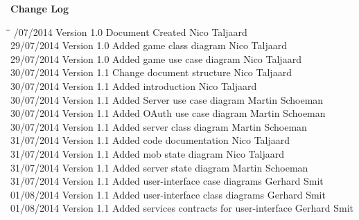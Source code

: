 \documentclass[letterpaper]{article}
\begin{document}
\begin{titlepage}
\begin{center}
\end{center}
\vfill %

\end{titlepage}


	\newpage
		{\LARGE \bf Change Log}\\[2em]
		
		\begin{tabbing}
			\hspace*{2.5cm}\=\hspace*{2.5cm}\=\hspace*{8cm}\=\hspace*{3cm} /07/2014	\> Version 1.0	\> Document Created 							\> Nico Taljaard \\
			29/07/2014	\> Version 1.0	\> Added game class diagram						\> Nico Taljaard \\
			29/07/2014	\> Version 1.0	\> Added game use case diagram					\> Nico Taljaard \\
			30/07/2014	\> Version 1.1	\> Change document structure					\> Nico Taljaard \\
			30/07/2014	\> Version 1.1	\> Added introduction							\> Nico Taljaard \\
			30/07/2014  \> Version 1.1  \> Added Server use case diagram				\> Martin Schoeman\\
			30/07/2014  \> Version 1.1  \> Added OAuth use case diagram					\> Martin Schoeman\\
			30/07/2014  \> Version 1.1  \> Added server class diagram					\> Martin Schoeman\\
			31/07/2014  \> Version 1.1  \> Added code documentation						\> Nico Taljaard\\
			31/07/2014  \> Version 1.1  \> Added mob state diagram						\> Nico Taljaard\\
			31/07/2014  \> Version 1.1  \> Added server state diagram					\> Martin Schoeman\\
			31/07/2014  \> Version 1.1  \> Added user-interface case diagrams			\> Gerhard Smit\\
			01/08/2014  \> Version 1.1  \> Added user-interface class diagrams			\> Gerhard Smit\\
			01/08/2014  \> Version 1.1  \> Added services contracts for user-interface 	\> Gerhard Smit\\

\end{tabbing}
\end{document}
